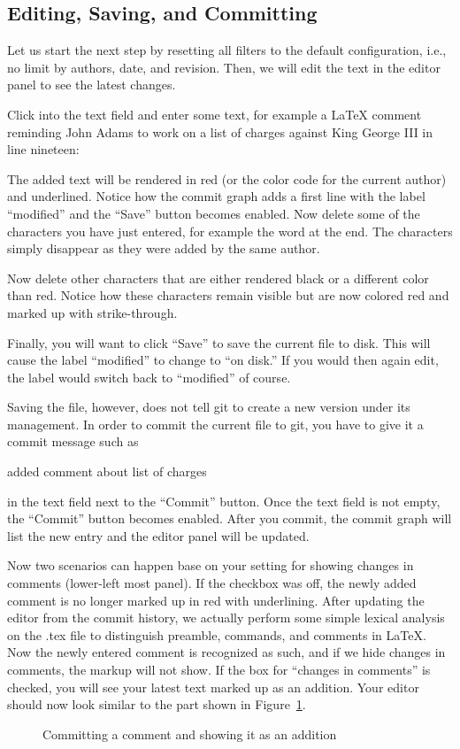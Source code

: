 \subsection{Editing, Saving, and Committing}

Let us start the next step by resetting all filters to the default configuration, i.e., no limit by authors, date, and revision.  Then, we will edit the text in the editor panel to see the latest changes.

Click into the text field and enter some text, for example a LaTeX comment reminding John Adams to work on a list of charges against King George III in line nineteen:
\begin{CodeVerbatim}
\end{CodeVerbatim}
The added text will be rendered in red (or the color code for the current author) and underlined.  Notice how the commit graph adds a first line with the label ``modified'' and the ``Save'' button becomes enabled.  Now delete some of the characters you have just entered, for example the word  at the end.  The characters simply disappear as they were added by the same author.

Now delete other characters that are either rendered black or a different color than red.  Notice how these characters remain visible but are now colored red and marked up with strike-through.

Finally, you will want to click ``Save'' to save the current file to disk.  This will cause the label ``modified'' to change to ``on disk.''  If you would then again edit, the label would switch back to ``modified'' of course.

Saving the file, however, does not tell git to create a new version under its management.  In order to commit the current file to git, you have to give it a commit message such as 
\begin{CodeVerbatim}
added comment about list of charges
\end{CodeVerbatim}
in the text field next to the ``Commit'' button.  Once the text field is not empty, the ``Commit'' button becomes enabled.  After you commit, the commit graph will list the new entry and the editor panel will be updated.  

Now two scenarios can happen base on your setting for showing changes in comments (lower-left most panel).  If the checkbox was off, the newly added comment is no longer marked up in red with underlining.  After updating the editor from the commit history, we actually perform some simple lexical analysis on the .tex file to distinguish preamble, commands, and comments in LaTeX.  Now the newly entered comment is recognized as such, and if we hide changes in comments, the markup will not show.  If the box for ``changes in comments'' is checked, you will see your latest text marked up as an addition.  Your editor should now look similar to the part shown in Figure~\ref{fig:commit-comment}.
\begin{figure}[t]
\centering
{}
\caption{Committing a comment and showing it as an addition} \label{fig:commit-comment}
\end{figure}

